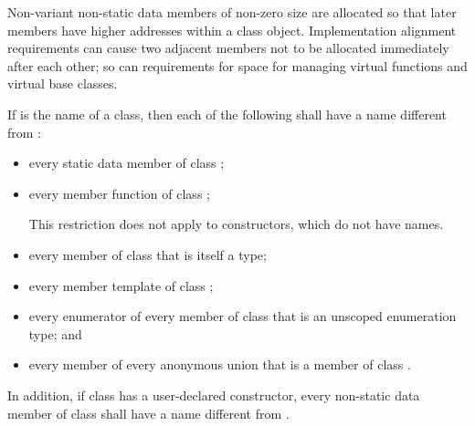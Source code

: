 \pnum
\begin{note}
%
Non-variant non-static data members of
non-zero size
are allocated so that later
members have higher addresses within a class object.
Implementation alignment requirements can cause two adjacent members
not to be allocated immediately after each other; so can requirements
for space for managing virtual functions and
virtual base classes.
\end{note}

\pnum
If  is the name of a class, then each of the following shall
have a name different from :
\begin{itemize}
\item every static data member of class ;

\item every member function of class ;
\begin{note}
This restriction does not apply to constructors, which do not have
names.
\end{note}%

\item every member of class  that is itself a type;

\item every member template of class ;

\item every enumerator of every member of class  that is an
unscoped enumeration type; and

\item every member of every anonymous union that is a member of class
.
\end{itemize}

\pnum
In addition, if class  has a user-declared
constructor, every non-static data member of class
 shall have a name different from .

